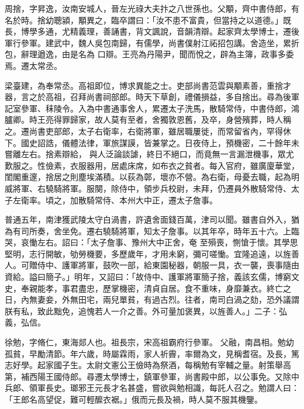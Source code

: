 
\begin{pinyinscope}

 周捨，字昇逸，汝南安城人，晉左光祿大夫抃之八世孫也。父顒，齊中書侍郎，有名於時。捨幼聰潁，顒異之，臨卒謂曰：「汝不患不富貴，但當持之以道德。」既長，博學多通，尤精義理，善誦書，背文諷說，音韻清辯。起家齊太學博士，遷後軍行參軍。建武中，魏人吳包南歸，有儒學，尚書僕射江祏招包講。舍造坐，累折包，辭理遒逸，由是名為
 口辯。王亮為丹陽尹，聞而悅之，辟為主簿，政事多委焉。遷太常丞。



 梁臺建，為奉常丞。高祖即位，博求異能之士。吏部尚書范雲與顒素善，重捨才器，言之於高祖，召拜尚書祠部郎。時天下草創，禮儀損益，多自捨出。尋為後軍記室參軍、秣陵令。入為中書通事舍人，累遷太子洗馬，散騎常侍，中書侍郎，鴻臚卿。時王亮得罪歸家，故人莫有至者，舍獨敦恩舊，及卒，身營殯葬，時人稱之。遷尚書吏部郎，太子右衛率，右衛將軍，雖居職屢徙，而常留省內，罕得休下。國史詔誥，儀體法律，軍旅謀謨，皆兼掌之。日夜侍上，預機密，二十餘年未嘗離左右。捨素辯給，
 與人泛論談謔，終日不絕口，而竟無一言漏泄機事，眾尤歎服之。性儉素，衣服器用，居處床席，如布衣之貧者。每入官府，雖廣廈華堂，閨閣重邃，捨居之則塵埃滿積。以荻為鄣，壞亦不營。為右衛，母憂去職，起為明威將軍、右驍騎將軍。服闋，除侍中，領步兵校尉，未拜，仍遷員外散騎常侍、太子左衛率。頃之，加散騎常侍、本州大中正，遷太子詹事。



 普通五年，南津獲武陵太守白渦書，許遺舍面錢百萬，津司以聞。雖書自外入，猶為有司所奏，舍坐免。遷右驍騎將軍，知太子詹事。以其年卒，時年五十六。上臨哭，哀慟左右。詔曰：「太子詹事、豫州大中正舍，奄
 至殞喪，惻愴于懷。其學思堅明，志行開敏，劬勞機要，多歷歲年，才用未窮，彌可嗟慟。宜隆追遠，以旌善人。可贈侍中、護軍將軍，鼓吹一部，給東園秘器，朝服一具，衣一襲，喪事隨由資給。謚曰簡子。」明年，又詔曰：「故侍中、護軍將軍簡子捨，義該玄儒，博窮文史，奉親能孝，事君盡忠，歷掌機密，清貞自居。食不重味，身靡兼衣。終亡之日，內無妻妾，外無田宅，兩兒單貧，有過古烈。往者，南司白渦之劾，恐外議謂朕有私，致此黜免，追愧若人一介之善。外可量加褒異，以旌善人。」二子：弘義，弘信。



 徐勉，字脩仁，東海郯人也。祖長宗，宋高祖霸府行參軍。
 父融，南昌相。勉幼孤貧，早勵清節。年六歲，時屬霖雨，家人祈霽，率爾為文，見稱耆宿。及長，篤志好學。起家國子生。太尉文憲公王儉時為祭酒，每稱勉有宰輔之量。射策舉高第，補西陽王國侍郎。尋遷太學博士，鎮軍參軍，尚書殿中郎，以公事免。又除中兵郎、領軍長史。瑯邪王元長才名甚盛，嘗欲與勉相識，每託人召之。勉謂人曰：「王郎名高望促，難可輕醿衣裾。」俄而元長及禍，時人莫不服其機鑒。




\end{pinyinscope}
